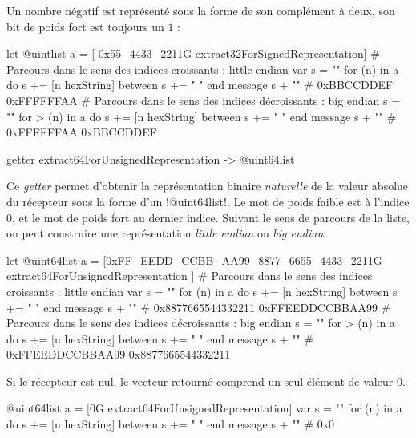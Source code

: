 Un nombre négatif est représenté sous la forme de son complément à deux, son bit de poids fort est toujours un $1$ :

\begin{galgas3}
let @uintlist a = [-0x55_4433_2211G extract32ForSignedRepresentation]
# Parcours dans le sens des indices croissants : little endian
var s = ""
for (n) in a
  do s += [n hexString]
  between s += " "
end
message s + "\n" # 0xBBCCDDEF 0xFFFFFFAA
# Parcours dans le sens des indices décroissants : big endian
s = ""
for > (n) in a
  do s += [n hexString]
  between s += " "
end
message s + "\n" # 0xFFFFFFAA 0xBBCCDDEF
\end{galgas3}






\begin{galgas3box}
getter extract64ForUnsignedRepresentation -> @uint64list
\end{galgas3box}

Ce \emph{getter} permet d'obtenir la représentation binaire \emph{naturelle} de la valeur absolue du récepteur sous la forme d'un \ggst!@uint64list!. Le mot de poids faible est à l'indice $0$, et le mot de poids fort au dernier indice. Suivant le sens de parcours de la liste, on peut construire une représentation \emph{little endian} ou \emph{big endian}.

\begin{galgas3}
let @uint64list a = [0xFF_EEDD_CCBB_AA99_8877_6655_4433_2211G
  extract64ForUnsignedRepresentation
]
# Parcours dans le sens des indices croissants : little endian
var s = ""
for (n) in a
  do s += [n hexString]
  between s += " "
end
message s + "\n" # 0x8877665544332211 0xFFEEDDCCBBAA99
# Parcours dans le sens des indices décroissants : big endian
s = ""
for > (n) in a
  do s += [n hexString]
  between s += " "
end
message s + "\n" # 0xFFEEDDCCBBAA99 0x8877665544332211
\end{galgas3}

Si le récepteur est nul, le vecteur retourné comprend un seul élément de valeur $0$.

\begin{galgas3}
@uint64list a = [0G extract64ForUnsignedRepresentation]
var s = ""
for (n) in a
  do s += [n hexString]
  between s += " "
end
message s + "\n" # 0x0
\end{galgas3}




